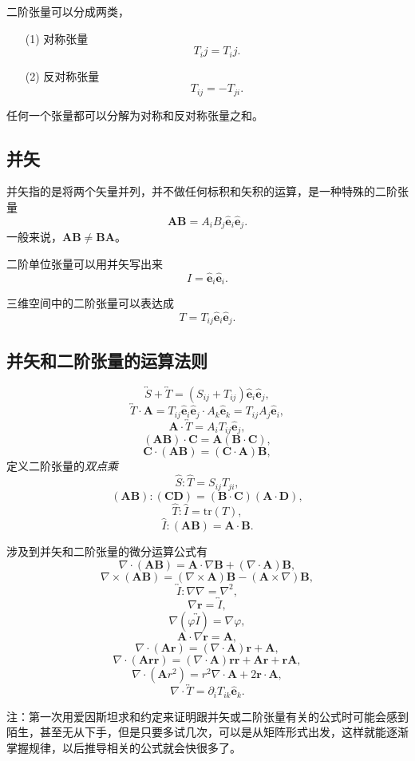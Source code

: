 \documentclass[UTF8]{ctexbook}
\renewcommand{\b}{\boldsymbol}
\renewcommand{\t}{\overleftrightarrow}
\numberwithin{equation}{chapter}
\begin{document}
	二阶张量可以分成两类，
	\begin{itemize}
		\item[(1)]对称张量
		\[T_ij=T_ij.\]
		
		\item[(2)]反对称张量
		\[T_{ij}=-T_{ji}.\]
		
	\end{itemize}
	任何一个张量都可以分解为对称和反对称张量之和。
	
	\subsection{并矢}
	并矢指的是将两个矢量并列，并不做任何标积和矢积的运算，是一种特殊的二阶张量
	\[\b{A}\b{B}=A_iB_j\hat{\b{e}}_i\hat{\b{e}}_j.\]
	一般来说，$\b{A}\b{B}\neq\b{B}\b{A}$。
	
	二阶单位张量可以用并矢写出来
	\[I=\hat{\b{e}}_i\hat{\b{e}}_i.\]
	
	三维空间中的二阶张量可以表达成
	\[T=T_{ij}\hat{\b{e}}_i\hat{\b{e}}_j.\]
	
	\subsection{并矢和二阶张量的运算法则}
	\[\overleftrightarrow{S}+\t{T}=(S_{ij}+T_{ij})\hat{\b{e}}_i\hat{\b{e}}_j,\]
	\[\t{T}\cdot\b{A}=T_{ij}\hat{\b{e}}_i\hat{\b{e}}_j\cdot A_k\hat{\b{e}}_k=T_{ij}A_j\hat{\b{e}}_i,\]
	\[\b{A}\cdot \t{T}=A_iT_{ij}\hat{\b{e}}_j,\]
	\[(\b{A}\b{B})\cdot\b{C}=\b{A}(\b{B}\cdot\b{C}),\]
	\[\b{C}\cdot(\b{A}\b{B})=(\b{C}\cdot\b{A})\b{B},\]
	定义二阶张量的\emph{双点乘}
	\[\hat{S}:\hat{T}=S_{ij}T_{ji},\]
	\[(\b{A}\b{B}):(\b{C}\b{D})=(\b{B}\cdot\b{C})(\b{A}\cdot\b{D}),\]
	\[\hat{T}:\hat{I}=\mathrm{tr}(T),\]
	\[\hat{I}:(\b{A}\b{B})=\b{A}\cdot\b{B}.\]
	
	涉及到并矢和二阶张量的微分运算公式有
	\[\nabla\cdot(\b{A}\b{B})=\b{A}\cdot\nabla\b{B}+(\nabla\cdot\b{A})\b{B},\]
	\[\nabla\times(\b{A}\b{B})=(\nabla\times\b{A})\b{B}-(\b{A}\times\nabla)\b{B},\]
	\[\t{I}:\nabla\nabla=\nabla^2,\]
	\[\nabla\b{r}=\t{I},\]
	\[\nabla(\varphi \t{I})=\nabla\varphi,\]
	\[\b{A}\cdot\nabla\b{r}=\b{A},\]
	\[\nabla\cdot(\b{A}\b{r})=(\nabla\cdot\b{A})\b{r}+\b{A},\]
	\[\nabla\cdot(\b{A}\b{r}\b{r})=(\nabla\cdot\b{A})\b{r}\b{r}+\b{A}\b{r}+\b{r}\b{A},\]
	\[\nabla\cdot(\b{A}r^2)=r^2\nabla\cdot\b{A}+2\b{r}\cdot\b{A},\]
	\[\nabla\cdot\t{T}=\partial_i T_{ik}\hat{\b{e}}_k.\]
	
	注：第一次用爱因斯坦求和约定来证明跟并矢或二阶张量有关的公式时可能会感到陌生，甚至无从下手，但是只要多试几次，可以是从矩阵形式出发，这样就能逐渐掌握规律，以后推导相关的公式就会快很多了。
	
\end{document}
